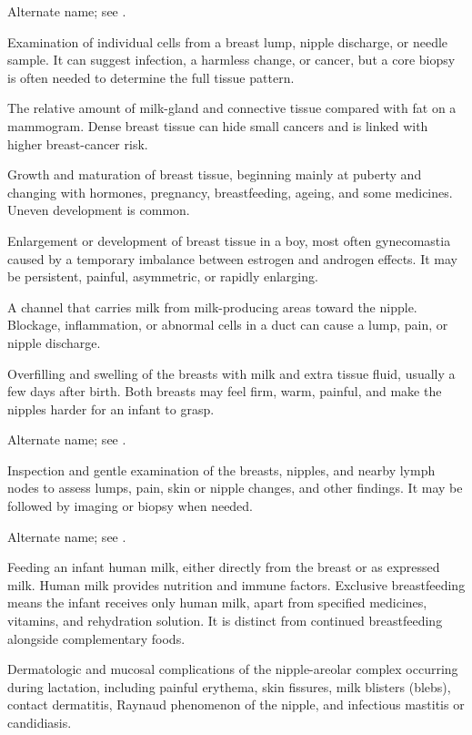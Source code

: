  Alternate name; see .

 Examination of individual cells from a breast lump, nipple discharge, or needle sample. It can suggest infection, a harmless change, or cancer, but a core biopsy is often needed to determine the full tissue pattern.

 The relative amount of milk-gland and connective tissue compared with fat on a mammogram. Dense breast tissue can hide small cancers and is linked with higher breast-cancer risk.

 Growth and maturation of breast tissue, beginning mainly at puberty and changing with hormones, pregnancy, breastfeeding, ageing, and some medicines. Uneven development is common.

 Enlargement or development of breast tissue in a boy, most often gynecomastia caused by a temporary imbalance between estrogen and androgen effects. It may be persistent, painful, asymmetric, or rapidly enlarging.

 A channel that carries milk from milk-producing areas toward the nipple. Blockage, inflammation, or abnormal cells in a duct can cause a lump, pain, or nipple discharge.

 Overfilling and swelling of the breasts with milk and extra tissue fluid, usually a few days after birth. Both breasts may feel firm, warm, painful, and make the nipples harder for an infant to grasp.

 Alternate name; see .

 Inspection and gentle examination of the breasts, nipples, and nearby lymph nodes to assess lumps, pain, skin or nipple changes, and other findings. It may be followed by imaging or biopsy when needed.

 Alternate name; see .

 Feeding an infant human milk, either directly from the breast or as expressed milk. Human milk provides
nutrition and immune factors. Exclusive breastfeeding means the infant receives
only human milk, apart from specified medicines, vitamins, and rehydration
solution. It is distinct from continued breastfeeding alongside complementary foods.

 Dermatologic and mucosal complications of the nipple-areolar complex occurring during lactation, including painful erythema, skin fissures, milk blisters (blebs), contact dermatitis, Raynaud phenomenon of the nipple, and infectious mastitis or candidiasis.

